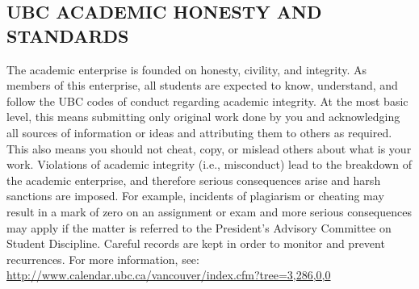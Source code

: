 \documentclass [11pt]{article}
\begin{document}




\subsection*{UBC ACADEMIC HONESTY AND STANDARDS}
The academic enterprise is founded on honesty, civility, and integrity. As members of this enterprise, all students are expected to know, understand, and follow the UBC codes of conduct regarding academic integrity. At the most basic level, this means submitting only original work done by you and acknowledging all sources of information or ideas and attributing them to others as required. This also means you should not cheat, copy, or mislead others about what is your work. Violations of academic integrity (i.e., misconduct) lead to the breakdown of the academic enterprise, and therefore serious consequences arise and harsh sanctions are imposed. For example, incidents of plagiarism or cheating may result in a mark of zero on an assignment or exam and more serious consequences may apply if the matter is referred to the President’s Advisory Committee on Student Discipline. Careful records are kept in order to monitor and prevent recurrences.
For more information, see: \url{http://www.calendar.ubc.ca/vancouver/index.cfm?tree=3,286,0,0}
\end{document}
